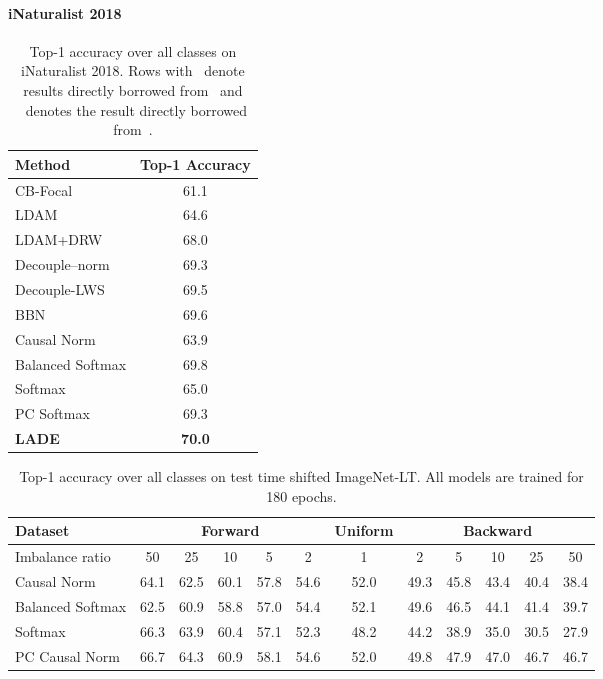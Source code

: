 \documentclass[final]{cvpr}
\begin{document}
\paragraph{iNaturalist 2018}
\begin{table}
\footnotesize
\centering
\caption{Top-1 accuracy over all classes on iNaturalist 2018. Rows with ~denote results directly borrowed from~\cite{kang2019decoupling} and ~denotes the result directly borrowed from~\cite{zhou2020bbn}.}
\label{tab:inat_main}
\vspace{0pt}
\begin{tabular}{lc}
\toprule
Method & Top-1 Accuracy \\
\midrule
CB-Focal & 61.1 \\
LDAM  & 64.6 \\
LDAM+DRW & 68.0 \\
Decouple--norm & 69.3 \\
Decouple-LWS & 69.5 \\
BBN & 69.6 \\
Causal Norm & 63.9 \\
Balanced Softmax & 69.8 \\
Softmax  & 65.0 \\
\midrule
PC Softmax & 69.3 \\
\textbf{LADE } & \textbf{70.0} \\
\bottomrule
\end{tabular}
\end{table} \begin{table*}[t]
\footnotesize
\centering
\caption{Top-1 accuracy over all classes on test time shifted ImageNet-LT. All models are trained for 180 epochs.}
\vspace{0px}
{
	\begin{tabular}{l|ccccc|c|ccccc}
    \toprule
    Dataset & \multicolumn{5}{c|}{Forward} & Uniform & \multicolumn{5}{c}{Backward}\\
    \midrule
    Imbalance ratio & 50 & 25 & 10 & 5 & 2 & 1 & 2 & 5 & 10 & 25 & 50 \\
    \midrule
	Causal Norm & 64.1 & 62.5 & 60.1 & 57.8 & 54.6 & 52.0 & 49.3 & 45.8 & 43.4 & 40.4 & 38.4 \\
	Balanced Softmax & 62.5 & 60.9 & 58.8 & 57.0 & 54.4 & 52.1 & 49.6 & 46.5 & 44.1 & 41.4 & 39.7 \\
	Softmax & 66.3 & 63.9 & 60.4 & 57.1 & 52.3 & 48.2 & 44.2 & 38.9 & 35.0 & 30.5 & 27.9 \\
    \midrule
	PC Causal Norm & 66.7 & 64.3 & 60.9 & 58.1 & 54.6 & 52.0 & 49.8 & 47.9 & 47.0 & 46.7 & 46.7 \\

\end{tabular}}
\end{table*}
\end{document}
